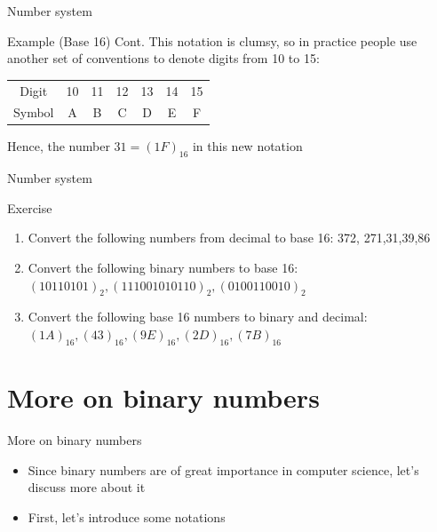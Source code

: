 \documentclass[10pt,xcolor={table,dvipsnames},t]{beamer}
\begin{document}
\begin{frame}{Number system}
  \begin{exampleblock}{Example (Base 16) Cont.}
    This notation is clumsy, so in practice people use another set of conventions to denote digits from 10 to 15:
    
    \begin{table}
    \begin{tabular}{ccccccc}
      
      Digit & 10 & 11 & 12 & 13 & 14 & 15\\
      Symbol& A & B & C & D & E & F \\  
    \end{tabular}
  \end{table}

    Hence, the number $31 = (1F)_{16}$ in this new notation 
  \end{exampleblock}
\end{frame}

\begin{frame}{Number system}
  \begin{exampleblock}{Exercise}
    \begin{enumerate}
      \item Convert the following numbers from decimal to base 16: 372, 271,31,39,86
      \item Convert the following binary numbers to base 16: $(10110101)_{2}, (111001010110)_{2},(0100110010)_2$
      \item Convert the following base 16 numbers to binary and decimal: $(1A)_{16},(43)_{16},(9E)_{16},(2D)_{16},(7B)_{16}$
    \end{enumerate}
  \end{exampleblock}
\end{frame}

\section{More on binary numbers}
\begin{frame}{More on binary numbers}
  \begin{itemize}
    \item Since binary numbers are of great importance in computer science, let's discuss more about it
    \item First, let's introduce some notations
  \end{itemize}
\end{frame}
\end{document}

